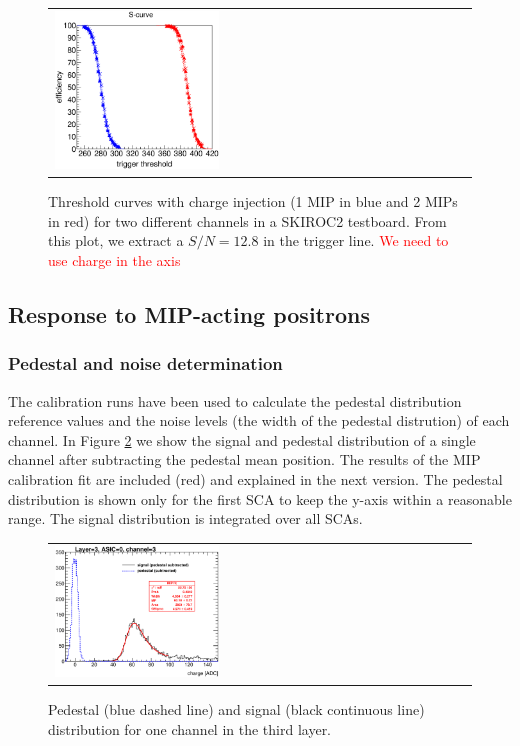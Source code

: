 \documentclass[final,3p,times,twocolumn]{elsarticle}
\newcommand{\todo}[1]{\textcolor{red}{{#1}}}
\begin{document}
\begin{figure}[!t]
    \centering
  \begin{tabular}{l}
	\includegraphics[width=0.4\textwidth]{../figs/commissioning/scurve_pp_fastshaper_ch.eps} \\
	\end{tabular}
\caption{Threshold curves with charge injection (1 MIP in blue and 2 MIPs in red) for two different channels in a SKIROC2 testboard. From this plot, we extract a $S/N = 12.8$ in the trigger line. \todo{We need to use charge in the axis}}
\label{scurves_injection}
\end{figure}


\subsection{Response to MIP-acting positrons}
\label{sec:calib}

\subsubsection{Pedestal and noise determination}
\label{sec:pedestal}

The calibration runs have been used to calculate the pedestal distribution reference values 
and the noise levels (the width of the pedestal distrution) of each channel.
In Figure \ref{signal_pedestal} we show the signal and pedestal distribution of a single channel after
subtracting the pedestal mean position. The results of the MIP calibration fit are included (red) and explained in the next version.
The pedestal distribution is shown only for the first SCA to keep the y-axis within a reasonable range.
The signal distribution is integrated over all SCAs.

\begin{figure}[!t]
  \centering
  \begin{tabular}{l}
    \includegraphics[width=0.4\textwidth]{../figs/mip_pedestal_example.eps}
  \end{tabular}
  \caption{Pedestal (blue dashed line) and signal (black continuous line) distribution for one channel in the third layer.}
\label{signal_pedestal}
\end{figure}
\end{document}

